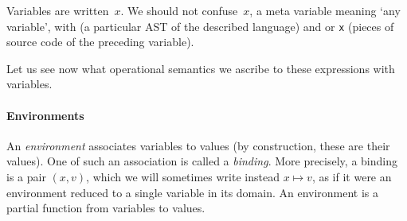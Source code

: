 \bigskip

Variables are written~$x$. We should not confuse~$x$, a meta variable
meaning `any variable', with   (a particular AST of
the described language) and  or \texttt{x} (pieces of source
code of the preceding variable).

Let us see now what operational semantics we ascribe to these
expressions with variables.

\paragraph{Environments}

An \emph{environment} associates variables to values (by construction,
these are their values). One of such an association is called a
\emph{binding}. More precisely, a binding is a pair $(x,v)$, which we
will sometimes write instead $x \mapsto v$, as if it were an
environment reduced to a single variable in its domain. An environment
is a partial function from variables to values.


